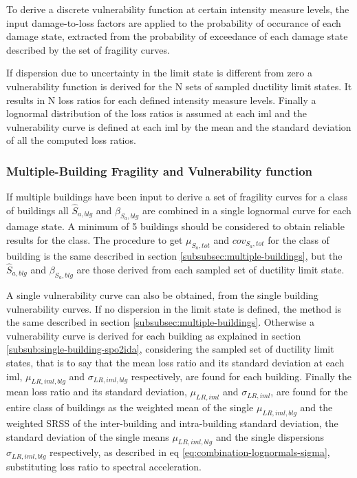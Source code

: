To derive a discrete vulnerability function at certain intensity measure levels, the input damage-to-loss factors are applied to the probability of occurance of each damage state, extracted from the probability of exceedance of each damage state described by the set of fragility curves. 

If dispersion due to uncertainty in the limit state is different from zero a vulnerability function is derived for the N sets of sampled ductility limit states. It results in N loss ratios for each defined intensity measure levels. Finally a lognormal distribution of the loss ratios is assumed at each iml and the vulnerability curve is defined at each iml by the mean and the standard deviation of all the computed loss ratios.

\subsubsection{Multiple-Building Fragility and Vulnerability function}
\label{subsubsec:multiple-building-spo2ida}
If multiple buildings have been input to derive a set of fragility curves for a class of buildings all $\hat{S}_{a,blg}$ and $\beta_{S_a,blg}$ are combined in a single lognormal curve for each damage state. A minimum of 5 buildings should be considered to obtain reliable results for the class. The procedure to get $\mu_{S_a,tot}$ and $cov_{S_a,tot}$ for the class of building is the same described in section \ref{subsubsec:multiple-buildings}, but the $\hat{S}_{a,blg}$ and $\beta_{S_a,blg}$ are those derived from each sampled set of ductility limit state.

A single vulnerability curve can also be obtained, from the single building vulnerability curves. If no dispersion in the limit state is defined, the method is the same described in section \ref{subsubsec:multiple-buildings}. Otherwise a vulnerability curve is derived for each building as explained in section \ref{subsub:single-building-spo2ida}, considering the sampled set of ductility limit states, that is to say that the mean loss ratio and its standard deviation at each iml, $\mu_{LR,iml,blg}$ and $\sigma_{LR,iml,blg}$ respectively, are found for each building.
Finally the mean loss ratio and its standard deviation, $\mu_{LR,iml}$ and $\sigma_{LR,iml}$, are found for the entire class of buildings as the weighted mean of the single $\mu_{LR,iml,blg}$ and the weighted SRSS of the inter-building and intra-building standard deviation, the standard deviation of the single means $\mu_{LR,iml,blg}$ and the single dispersions $\sigma_{LR,iml,blg}$ respectively, as described in eq \ref{eq:combination-lognormals-sigma}, substituting loss ratio to spectral acceleration.


